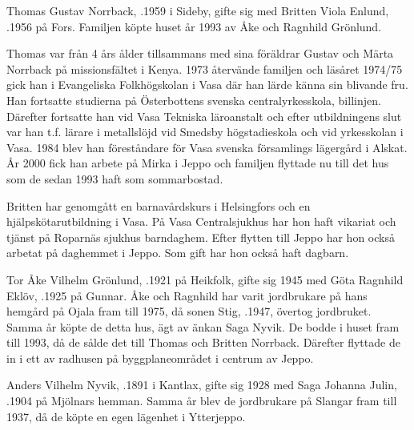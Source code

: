
Thomas Gustav Norrback, .1959 i Sideby, gifte sig med Britten Viola Enlund, .1956 på Fors. Familjen köpte huset år 1993  av Åke och Ragnhild Grönlund.

Thomas var från 4 års ålder tillsammans med sina föräldrar Gustav och Märta Norrback på missionsfältet i Kenya. 1973 återvände familjen och läsåret 1974/75 gick han i Evangeliska Folkhögskolan i Vasa där han lärde känna sin blivande fru. Han fortsatte studierna på Österbottens svenska centralyrkesskola, billinjen. Därefter fortsatte han vid Vasa Tekniska läroanstalt och efter utbildningens slut var han t.f. lärare i metallslöjd vid Smedsby högstadieskola och vid yrkesskolan i Vasa. 1984 blev han föreståndare för Vasa svenska församlings lägergård i Alskat. År 2000 fick han arbete på Mirka i Jeppo och familjen flyttade nu till det hus som de sedan 1993 haft som sommarbostad.


Britten har genomgått en barnavårdskurs i Helsingfors och en hjälpskötarutbildning i Vasa. På Vasa Centralsjukhus har hon haft vikariat och tjänst på Roparnäs sjukhus barndaghem. Efter flytten till Jeppo har hon också  arbetat på daghemmet i Jeppo. Som gift har hon också haft dagbarn.
\begin{jhchildren}
  \item {}
  \item {}
  \item {}
\end{jhchildren}


Tor Åke Vilhelm Grönlund, .1921 på Heikfolk, gifte sig 1945 med Göta Ragnhild Eklöv, .1925 på Gunnar. Åke och Ragnhild har varit jordbrukare på hans hemgård på Ojala fram till 1975, då sonen Stig, .1947, övertog jordbruket. Samma år köpte de detta hus, ägt av änkan Saga Nyvik. De bodde i huset fram till 1993, då de sålde det till Thomas och Britten Norrback. Därefter flyttade de in i ett av radhusen på byggplaneområdet i centrum av Jeppo.


Anders Vilhelm Nyvik, .1891 i Kantlax, gifte sig 1928 med Saga Johanna Julin, .1904 på Mjölnars hemman. Samma år blev de jordbrukare på Slangar fram till 1937, då de köpte en egen lägenhet i Ytterjeppo.


